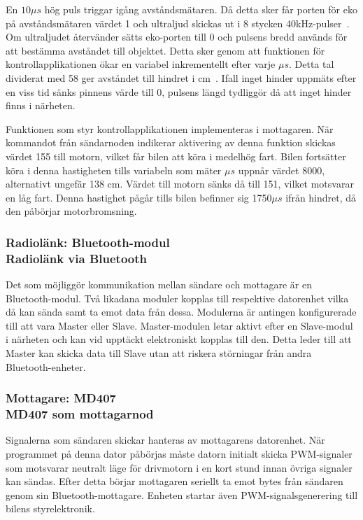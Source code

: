 \documentclass[a4paper]{article}
\begin{document}
\vspace{5mm} \noindent
En $10\mu s$ hög puls triggar igång avståndsmätaren. Då detta sker får porten för eko på avståndsmätaren värdet 1 och ultraljud skickas ut i 8 stycken 40kHz-pulser~\cite{DistMeasure}. Om ultraljudet återvänder sätts eko-porten till 0 och pulsens bredd används för att bestämma avståndet till objektet. Detta sker genom att funktionen för kontrollapplikationen ökar en variabel inkrementellt efter varje $\mu s$. Detta tal dividerat med 58 ger avståndet till hindret i cm~\cite{DistMeasure}. Ifall inget hinder uppmäts efter en viss tid sänks pinnens värde till 0, pulsens längd tydliggör då att inget hinder finns i närheten.

\vspace{5mm} \noindent
Funktionen som styr kontrollapplikationen implementeras i mottagaren. När kommandot från sändarnoden indikerar aktivering av denna funktion skickas värdet 155 till motorn, vilket får bilen att köra i medelhög fart. Bilen fortsätter köra i denna hastigheten tills variabeln som mäter $\mu s$ uppnår värdet 8000, alternativt ungefär 138 cm. Värdet till motorn sänks då till 151, vilket motsvarar en låg fart. Denna hastighet pågår tills bilen befinner sig 1750$\mu s$ ifrån hindret, då den påbörjar motorbromsning.


\subsubsection{Radiolänk: Bluetooth-modul \\ Radiolänk via Bluetooth}
Det som möjliggör kommunikation mellan sändare och mottagare är en Bluetooth-modul. Två likadana moduler kopplas till respektive datorenhet vilka då kan sända samt ta emot data från dessa. Modulerna är antingen konfigurerade till att vara Master eller Slave. Master-modulen letar aktivt efter en Slave-modul i närheten och kan vid upptäckt elektroniskt kopplas till den. Detta leder till att Master kan skicka data till Slave utan att riskera störningar från andra Bluetooth-enheter.


\subsubsection{Mottagare: MD407 \\ MD407 som mottagarnod}
Signalerna som sändaren skickar hanteras av mottagarens datorenhet. När programmet på denna dator påbörjas måste datorn initialt skicka PWM-signaler som motsvarar neutralt läge för drivmotorn i en kort stund innan övriga signaler kan sändas. Efter detta börjar mottagaren seriellt ta emot bytes från sändaren genom sin Bluetooth-mottagare. Enheten startar även PWM-signalsgenerering till bilens styrelektronik. 
\end{document}
